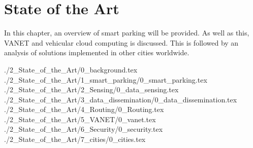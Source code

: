 \chapter{State of the Art}
In this chapter, an overview of smart parking will be provided. As well as this, \ac{VANET} and vehicular cloud computing is discussed. This is followed by an analysis of solutions implemented in other cities worldwide.

{./2_State_of_the_Art/0_background.tex}
{./2_State_of_the_Art/1_smart_parking/0_smart_parking.tex}
{./2_State_of_the_Art/2_Sensing/0_data_sensing.tex}
{./2_State_of_the_Art/3_data_dissemination/0_data_dissemination.tex}
{./2_State_of_the_Art/4_Routing/0_Routing.tex}
{./2_State_of_the_Art/5_VANET/0_vanet.tex}
{./2_State_of_the_Art/6_Security/0_security.tex}
{./2_State_of_the_Art/7_cities/0_cities.tex}




